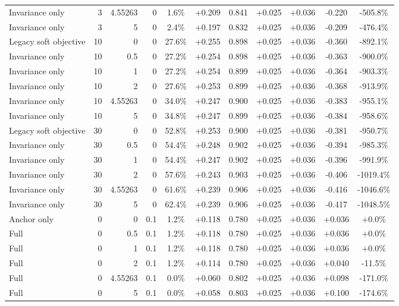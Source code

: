 \begin{table}[htbp]
\begin{tabular}{lrrrccccccc}
Invariance only & 3 & 4.55263 & 0 & 1.6\% & +0.209 & 0.841 & +0.025 & +0.036 & -0.220 & -505.8\% \\
Invariance only & 3 & 5 & 0 & 2.4\% & +0.197 & 0.832 & +0.025 & +0.036 & -0.209 & -476.4\% \\
Legacy soft objective & 10 & 0 & 0 & 27.6\% & +0.255 & 0.898 & +0.025 & +0.036 & -0.360 & -892.1\% \\
Invariance only & 10 & 0.5 & 0 & 27.2\% & +0.254 & 0.898 & +0.025 & +0.036 & -0.363 & -900.0\% \\
Invariance only & 10 & 1 & 0 & 27.2\% & +0.254 & 0.899 & +0.025 & +0.036 & -0.364 & -903.3\% \\
Invariance only & 10 & 2 & 0 & 27.6\% & +0.253 & 0.899 & +0.025 & +0.036 & -0.368 & -913.9\% \\
Invariance only & 10 & 4.55263 & 0 & 34.0\% & +0.247 & 0.900 & +0.025 & +0.036 & -0.383 & -955.1\% \\
Invariance only & 10 & 5 & 0 & 34.8\% & +0.247 & 0.899 & +0.025 & +0.036 & -0.384 & -958.6\% \\
Legacy soft objective & 30 & 0 & 0 & 52.8\% & +0.253 & 0.900 & +0.025 & +0.036 & -0.381 & -950.7\% \\
Invariance only & 30 & 0.5 & 0 & 54.4\% & +0.248 & 0.902 & +0.025 & +0.036 & -0.394 & -985.3\% \\
Invariance only & 30 & 1 & 0 & 54.4\% & +0.247 & 0.902 & +0.025 & +0.036 & -0.396 & -991.9\% \\
Invariance only & 30 & 2 & 0 & 57.6\% & +0.243 & 0.903 & +0.025 & +0.036 & -0.406 & -1019.4\% \\
Invariance only & 30 & 4.55263 & 0 & 61.6\% & +0.239 & 0.906 & +0.025 & +0.036 & -0.416 & -1046.6\% \\
Invariance only & 30 & 5 & 0 & 62.4\% & +0.239 & 0.906 & +0.025 & +0.036 & -0.417 & -1048.5\% \\
Anchor only & 0 & 0 & 0.1 & 1.2\% & +0.118 & 0.780 & +0.025 & +0.036 & +0.036 & +0.0\% \\
Full & 0 & 0.5 & 0.1 & 1.2\% & +0.118 & 0.780 & +0.025 & +0.036 & +0.036 & +0.0\% \\
Full & 0 & 1 & 0.1 & 1.2\% & +0.118 & 0.780 & +0.025 & +0.036 & +0.036 & +0.0\% \\
Full & 0 & 2 & 0.1 & 1.2\% & +0.114 & 0.780 & +0.025 & +0.036 & +0.040 & -11.5\% \\
Full & 0 & 4.55263 & 0.1 & 0.0\% & +0.060 & 0.802 & +0.025 & +0.036 & +0.098 & -171.0\% \\
Full & 0 & 5 & 0.1 & 0.0\% & +0.058 & 0.803 & +0.025 & +0.036 & +0.100 & -174.6\% \\

\end{tabular}
\end{table}
